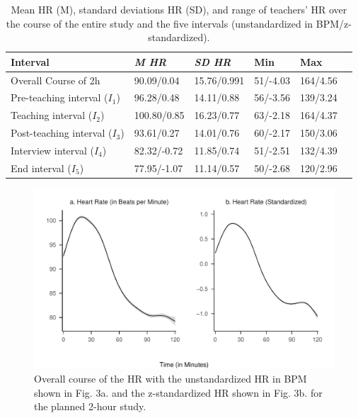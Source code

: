 \documentclass[preprint, 3p,
sort,]{elsarticle} %
\begin{document}
\renewcommand{\arraystretch}{1.5}

\begin{table}[ht]
    \centering
    \begin{tabularx}{\textwidth}{lXXXXX}
        \toprule
        Interval & \textit{M HR} & \textit{SD HR} & Min & Max \\
        \midrule
        Overall Course of 2h & 90.09/0.04\footnotemark[9] & 15.76/0.991 & 51/-4.03 & 164/4.56 \\
        Pre-teaching interval ($I_1$) & 96.28/0.48 & 14.11/0.88 & 56/-3.56 & 139/3.24 \\
        Teaching interval ($I_2$) & 100.80/0.85 & 16.23/0.77 & 63/-2.18 & 164/4.37 \\
        Post-teaching interval ($I_3$) & 93.61/0.27 & 14.01/0.76 & 60/-2.17 & 150/3.06 \\
        Interview interval ($I_4$) & 82.32/-0.72 & 11.85/0.74 & 51/-2.51 & 132/4.39 \\
        End interval ($I_5$) & 77.95/-1.07 & 11.14/0.57 & 50\footnotemark[10]/-2.68 & 120/2.96 \\
        \bottomrule
    \end{tabularx}
    \caption{Mean HR (M), standard deviations HR (SD), and range of teachers’ HR over the course of the entire study and the five intervals (unstandardized in BPM/z-standardized).}
    \label{tab_1}

    
\end{table}

\begin{figure}[H]
  \centering
  \includegraphics[width=1\textwidth]{plots_publication/loess_plot_std_unstd_new.pdf}
  \caption{Overall course of the HR with the unstandardized HR in BPM shown in Fig. 3a. and the z-standardized HR shown in Fig. 3b. for the planned 2-hour study.}
  \label{Overall course of the HR with the unstandardized HR in BPM shown in Fig. 3a. and the z-standardized HR shown in Fig. 3b. for the planned 2-hour study.}
\end{figure}
\end{document}
